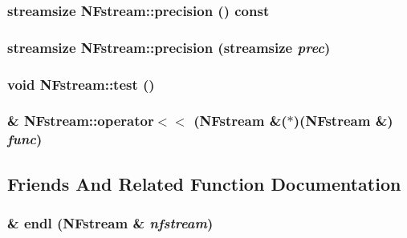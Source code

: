 \subsubsection{\setlength{\rightskip}{0pt plus 5cm}streamsize NFstream::precision () const}\label{classNFstream_fd65e74a7548bec6a7c00280e00ca62d}


\subsubsection{\setlength{\rightskip}{0pt plus 5cm}streamsize NFstream::precision (streamsize {\em prec})}\label{classNFstream_8c07a5899ca4b3656cc268f0ffa3bdf6}


\subsubsection{\setlength{\rightskip}{0pt plus 5cm}void NFstream::test ()\hspace{0.3cm}{\tt  [static]}}\label{classNFstream_3a9fc88ef4736bce0594cf5c42e9a327}


\subsubsection{ \& NFstream::operator$<$$<$ ({\bf NFstream} \&($\ast$)({\bf NFstream} \&) {\em func})}\label{classNFstream_32887795b0724c718638a2cb316fa36f}




\subsection{Friends And Related Function Documentation}
\subsubsection{\& endl ({\bf NFstream} \& {\em nfstream})\hspace{0.3cm}{\tt  [friend]}}\label{classNFstream_70d95b404a0185199948bf778584bdc3}


